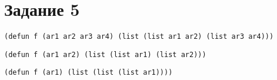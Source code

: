 \section{Задание 5}
\begin{center}
	\begin{lstlisting}[label=b5, caption={Выражение 1}]
(defun f (ar1 ar2 ar3 ar4) (list (list ar1 ar2) (list ar3 ar4)))
	\end{lstlisting}
	\begin{lstlisting}[label=a5, caption={Выражение 2}]
(defun f (ar1 ar2) (list (list ar1) (list ar2)))
	\end{lstlisting}
	\begin{lstlisting}[label=c5, caption={Выражение 3}]
(defun f (ar1) (list (list (list ar1))))
	\end{lstlisting}
\end{center}